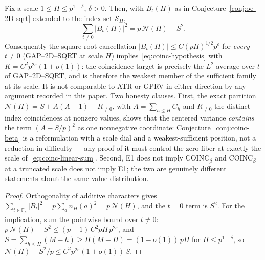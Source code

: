 \begin{proposition}
\label{prop:coinc-position}
Fix a scale $1\le H\le p^{1-\delta}$, $\delta>0$.  Then, with $B_t(H)$ as
in Conjecture~\ref{conj:oe-2D-sqrt} extended to the index set
$\mathcal S_H$,
\begin{equation}\label{eq:coinc-parseval}
 \sum_{t\ne0}\bigl|B_t(H)\bigr|^2
 =p\,\mathcal N(H)-S^2 .
\end{equation}
Consequently the square-root cancellation
$|B_t(H)|\le C(pH)^{1/2}p^{\varepsilon}$ for \emph{every} $t\ne0$
(GAP--2D--SQRT at scale $H$) implies~\eqref{eq:coinc-hypothesis} with
$K=C^2p^{2\varepsilon}(1+o(1))$: the coincidence target is precisely the
$L^2$-average over $t$ of GAP--2D--SQRT, and is therefore the weakest
member of the sufficient family at its scale.  It is not comparable to
ATR or GPRV in either direction by any argument recorded in this paper.
Two honesty clauses.  First, the exact partition
$\mathcal N(H)=S+A(A-1)+R_{\ne0}$, with $A=\sum_{h\le H}C_h$ and
$R_{\ne0}$ the distinct-index coincidences at nonzero values, shows that
the centered variance \emph{contains} the term $(A-S/p)^2$ as one
nonnegative coordinate: Conjecture~\ref{conj:coinc-beta} is a
reformulation with a scale dial and a weakest-sufficient position, not a
reduction in difficulty --- any proof of it must control the zero fiber
at exactly the scale of~\eqref{eq:coinc-linear-sum}.  Second, E1 does not
imply $\mathrm{COINC}_\beta$ and $\mathrm{COINC}_\beta$ at a truncated
scale does not imply E1; the two are genuinely different statements about
the same value distribution.
\end{proposition}

\begin{proof}
Orthogonality of additive characters gives
$\sum_{t\in\mathbb F_p}|B_t|^2=p\sum_an_H(a)^2=p\,\mathcal N(H)$, and the
$t=0$ term is $S^2$.  For the implication, sum the pointwise bound over
$t\ne0$: $p\,\mathcal N(H)-S^2\le(p-1)\,C^2pH\,p^{2\varepsilon}$, and
$S=\sum_{h\le H}(M-h)\ge H(M-H)=(1-o(1))\,pH$ for $H\le p^{1-\delta}$,
so $\mathcal N(H)-S^2/p\le C^2p^{2\varepsilon}(1+o(1))\,S$.
\end{proof}

